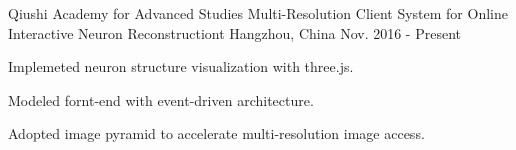 \cventry
{Qiushi Academy for Advanced Studies} %
{Multi-Resolution Client System for Online Interactive Neuron Reconstructiont} %
{Hangzhou, China} %
{Nov. 2016 - Present} %
{ %
\begin{cvitems}
    \item {Implemeted neuron structure visualization with three.js.}
    \item {Modeled fornt-end with event-driven architecture. }
    \item {Adopted image pyramid to accelerate multi-resolution image access.}
\end{cvitems}
}
